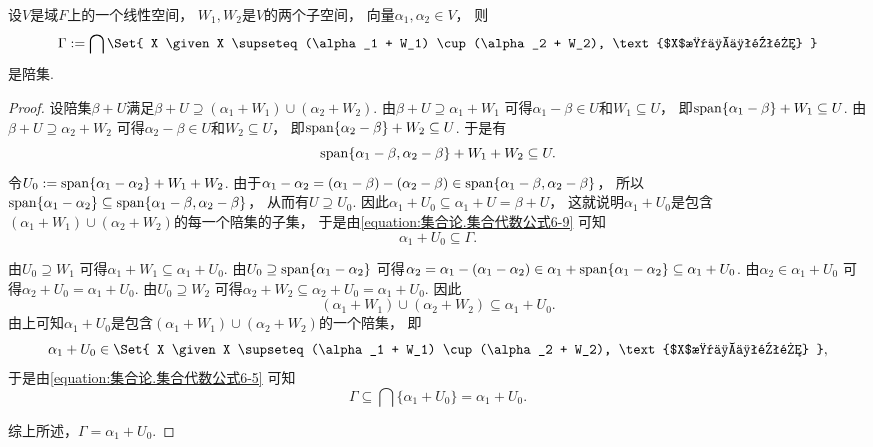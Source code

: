 \begin{lemma}\label{theorem:线性空间.商空间.陪集.线性空间中全体陪集对联运算封闭}
设\(V\)是域\(F\)上的一个线性空间，
\(W_1,W_2\)是\(V\)的两个子空间，
向量\(\alpha_1,\alpha_2 \in V\)，
则\begin{equation*}
	\Gamma
	\defeq
	\bigcap\Set{
		X
		\given
		X \supseteq (\alpha_1 + W_1) \cup (\alpha_2 + W_2),
		\text{$X$是一个陪集}
	}
\end{equation*}
是陪集.
\begin{proof}
设陪集\(\beta + U\)满足\(\beta + U \supseteq (\alpha_1 + W_1) \cup (\alpha_2 + W_2)\).
由\(\beta + U \supseteq \alpha_1 + W_1\)
可得\(\alpha_1 - \beta \in U\)和\(W_1 \subseteq U\)，
即\(\operatorname{span}\{\alpha_1 - \beta\} + W_1 \subseteq U\).
由\(\beta + U \supseteq \alpha_2 + W_2\)
可得\(\alpha_2 - \beta \in U\)和\(W_2 \subseteq U\)，
即\(\operatorname{span}\{\alpha_2 - \beta\} + W_2 \subseteq U\).
于是有\begin{equation*}
	\operatorname{span}\{\alpha_1 - \beta,\alpha_2 - \beta\} + W_1 + W_2 \subseteq U.
\end{equation*}
令\(U_0 := \operatorname{span}\{\alpha_1 - \alpha_2\} + W_1 + W_2\).
由于\(
	\alpha_1 - \alpha_2
	= (\alpha_1 - \beta) - (\alpha_2 - \beta)
	\in \operatorname{span}\{\alpha_1 - \beta,\alpha_2 - \beta\}
\)，
所以\(
	\operatorname{span}\{\alpha_1 - \alpha_2\}
	\subseteq
	\operatorname{span}\{\alpha_1 - \beta,\alpha_2 - \beta\}
\)，
从而有\(U \supseteq U_0\).
因此\(
	\alpha_1 + U_0
	\subseteq
	\alpha_1 + U
	= \beta + U
\)，
这就说明\(\alpha_1 + U_0\)是包含\((\alpha_1 + W_1) \cup (\alpha_2 + W_2)\)的每一个陪集的子集，
于是由\cref{equation:集合论.集合代数公式6-9}
可知\begin{equation*}
	\alpha_1 + U_0
	\subseteq
	\Gamma.
\end{equation*}

由\(U_0 \supseteq W_1\)
可得\(\alpha_1 + W_1 \subseteq \alpha_1 + U_0\).
由\(U_0 \supseteq \operatorname{span}\{\alpha_1 - \alpha_2\}\)
可得\(
	\alpha_2
	= \alpha_1 - (\alpha_1 - \alpha_2)
	\in \alpha_1 + \operatorname{span}\{\alpha_1 - \alpha_2\}
	\subseteq \alpha_1 + U_0
\).
由\(\alpha_2 \in \alpha_1 + U_0\)
可得\(\alpha_2 + U_0 = \alpha_1 + U_0\).
由\(U_0 \supseteq W_2\)
可得\(
	\alpha_2 + W_2
	\subseteq
	\alpha_2 + U_0
	= \alpha_1 + U_0
\).
因此\begin{equation*}
	(\alpha_1 + W_1) \cup (\alpha_2 + W_2)
	\subseteq
	\alpha_1 + U_0.
\end{equation*}
由上可知\(\alpha_1 + U_0\)是包含\((\alpha_1 + W_1) \cup (\alpha_2 + W_2)\)的一个陪集，
即\begin{equation*}
	\alpha_1 + U_0
	\in
	\Set{
		X
		\given
		X \supseteq (\alpha_1 + W_1) \cup (\alpha_2 + W_2),
		\text{$X$是一个陪集}
	},
\end{equation*}
于是由\cref{equation:集合论.集合代数公式6-5}
可知\begin{equation*}
	\Gamma
	\subseteq
	\bigcap\{\alpha_1 + U_0\}
	=
	\alpha_1 + U_0.
\end{equation*}

综上所述，\(\Gamma = \alpha_1 + U_0\).
\end{proof}
\end{lemma}

